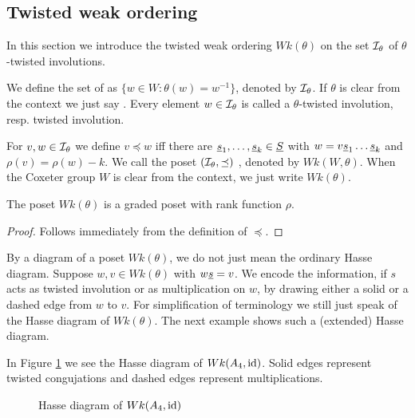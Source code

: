 \subsection{Twisted weak ordering}
\label{sec:twisted-involutions-twisted-weak-ordering}

In this section we introduce the twisted weak ordering $Wk(\theta)$ on the set $\mathcal{I}_{\theta}$ of $\theta$-twisted involutions.

\begin{defi}
	We define the set of  as $\{ w \in W : \theta(w) = w^{-1} \}$, denoted by $\mathcal{I}_{\theta}$. If $\theta$ is clear from the context we just say . Every element $w \in \mathcal{I}_{\theta}$ is called a $\theta$-twisted involution, resp. twisted involution.
\end{defi}

\begin{defi}
	For $v,w \in \mathcal{I}_{\theta}$ we define $v \preceq w$ iff there are $\underline{s}_1, \ldots, \underline{s}_k \in \underline{S}$ with $w = v \underline{s}_1 \ldots \underline{s}_k$ and $\rho(v) = \rho(w) - k$. We call the poset $(\mathcal{I}_{\theta},\preceq)$ , denoted by $Wk(W, \theta)$. When the Coxeter group $W$ is clear from the context, we just write $Wk(\theta)$.
\end{defi}

\begin{lemm}
	The poset $Wk(\theta)$ is a graded poset with rank function $\rho$.

	\begin{proof}
		Follows immediately from the definition of $\preceq$.
	\end{proof}
\end{lemm}

By a diagram of a poset $Wk(\theta)$, we do not just mean the ordinary Hasse diagram. Suppose $w,v \in Wk(\theta)$ with $w \underline{s} = v$. We encode the information, if $s$ acts as twisted involution or as multiplication on $w$, by drawing either a solid or a dashed edge from $w$ to $v$. For simplification of terminology we still just speak of the Hasse diagram of $Wk(\theta)$. The next example shows such a (extended) Hasse diagram.

\begin{exam}
	In Figure \ref{fig:a4} we see the Hasse diagram of $Wk(A_4, \operatorname{id})$. Solid edges represent twisted congujations and dashed edges represent multiplications.
	\begin{figure}[ht]
		\centering
		
		\caption{Hasse diagram of $Wk(A_4, \operatorname{id})$}
		\label{fig:a4}
	\end{figure}
\end{exam}

